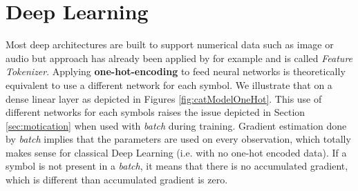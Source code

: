 \section{Deep Learning}\label{deepLearning}




Most deep architectures are built to support numerical data such as image or audio but \ohe approach has already been applied by \cite{RevisitingDeepForTabular} for example and is called \textit{Feature Tokenizer}. Applying \textbf{one-hot-encoding} to feed neural networks is theoretically equivalent to use a different network for each symbol. We illustrate that on a dense linear layer as depicted in Figures \ref{fig:catModelOneHot}. This use of different networks for each symbols raises the issue depicted in Section \ref{sec:motication} when used with \textit{batch} during training. Gradient estimation done by \textit{batch} implies that the parameters are used on every observation, which totally makes sense for classical Deep Learning (i.e. with no one-hot encoded data). If a symbol is not present in a \textit{batch}, it means that there is no accumulated gradient, which is different than accumulated gradient is zero.



